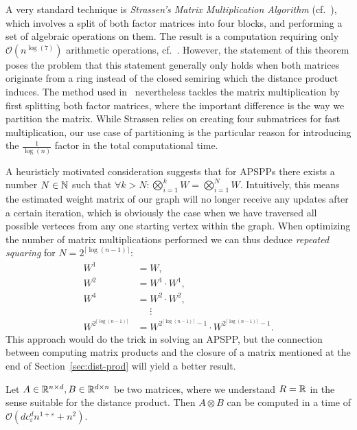 A very standard technique is \emph{Strassen's Matrix Multiplication Algorithm} (cf.~\cite[Section~6.2]{Aho1974}), which involves a split of both factor matrices into four blocks, and performing a set of algebraic operations on them.
The result is a computation requiring only $\mathcal{O}\left( n^{\log(7)} \right)$ arithmetic operations, cf.~\cite[Theorem~6.1]{Aho1974}.
However, the statement of this theorem poses the problem that this statement generally only holds when both matrices originate from a ring instead of the closed semiring which the distance product induces.
The method used in~\cite{Chan2007} nevertheless tackles the matrix multiplication by first splitting both factor matrices, where the important difference is the way we partition the matrix.
While Strassen relies on creating four submatrices for fast multiplication, our use case of partitioning is the particular reason for introducing the $\frac{1}{\log(n)}$ factor in the total computational time.

A heuristicly motivated consideration suggests that for APSPPs there exists a number $N \in \mathbb{N}$ such that $\forall k > N: \bigotimes\limits_{i = 1}^k W = \bigotimes\limits_{i = 1}^N W$.
Intuitively, this means the estimated weight matrix of our graph will no longer receive any updates after a certain iteration, which is obviously the case when we have traversed all possible verteces from any one starting vertex within the graph.
When optimizing the number of matrix multiplications performed we can thus deduce \emph{repeated squaring} for $N = 2^{\lceil \log(n - 1) \rceil}$:
\begin{align*}
    W^1 &= W, \\
    W^2 &= W^1 \cdot W^1, \\
    W^4 &= W^2 \cdot W^2, \\
    &\phantom{=}\!\vdots \\
    W^{2^{\lceil \log(n - 1) \rceil}} &= W^{2^{\lceil \log(n - 1) \rceil} - 1} \cdot W^{2^{\lceil \log(n - 1) \rceil} - 1}.
\end{align*}
This approach would do the trick in solving an APSPP, but the connection between computing matrix products and the closure of a matrix mentioned at the end of Section~\ref{sec:dist-prod} will yield a better result.

\begin{theorem}\label{thm:rect-distance-product}
    Let $A \in \mathbb{R}^{n \times d}, B \in \mathbb{R}^{d \times n}$ be two matrices, where we understand $R = \mathbb{R}$ in the sense suitable for the distance product.
    Then $A \otimes B$ can be computed in a time of $\mathcal{O}\left( d c_\varepsilon^d n^{1 + \varepsilon} + n^2 \right)$.
\end{theorem}

